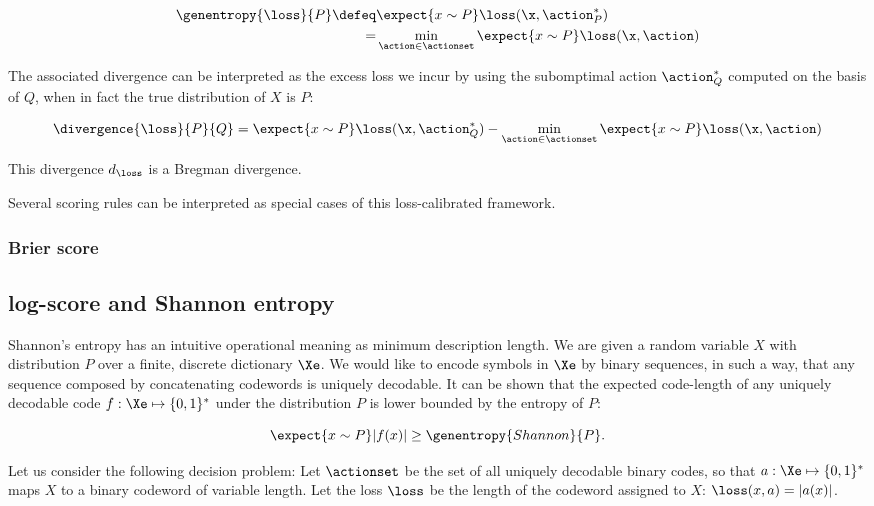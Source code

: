 \begin{align}
	\genentropy{\loss}{P} \defeq &\expect{x\sim P} \loss(\x,\action^{*}_{P})\\
		= &\min_{\action\in\actionset} \expect{x\sim P} \loss(\x,\action)
\end{align}

The associated divergence can be interpreted as the excess loss we incur by using the subomptimal action $\action^{*}_{Q}$ computed on the basis of $Q$, when in fact the true distribution of $X$ is $P$:

\begin{align}
	\divergence{\loss}{P}{Q} = \expect{x\sim P} \loss(\x,\action^{*}_{Q}) - \min_{\action \in \actionset}\expect{x\sim P} \loss(\x,\action)
\end{align}

This divergence $d_\loss$ is a Bregman divergence.

Several scoring rules can be interpreted as special cases of this loss-calibrated framework.

\subsubsection{Brier score}



\subsection{log-score and Shannon entropy}

Shannon's entropy has an intuitive operational meaning as minimum description length. We are given a random variable $X$ with distribution $P$ over a finite, discrete dictionary $\Xe$. We would like to encode symbols in $\Xe$ by binary sequences, in such a way, that any sequence composed by concatenating codewords is uniquely decodable. It can be shown that the expected code-length of any uniquely decodable code $f:\Xe\mapsto\{0,1\}^{*}$ under the distribution $P$ is lower bounded by the entropy of $P$:

\begin{equation}
	\expect{x \sim P} \vert f(x) \vert \geq \genentropy{Shannon}{P}.
\end{equation}


Let us consider the following decision problem: Let $\actionset$ be the set of all uniquely decodable binary codes, so that $a:\Xe\mapsto\{0,1\}^{*}$ maps $X$ to a binary codeword of variable length. Let the loss $\loss$ be the length of the codeword assigned to $X$: $\loss(x,a) = \vert a(x)\vert$.

